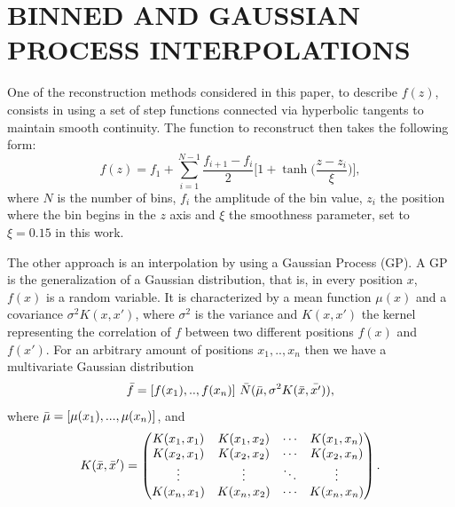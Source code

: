 \documentclass[twocolumn,a4paper,reprint,amssymb,aps,prd,groupedaddress,superscriptaddress,nofootinbib]{revtex4-2}
\begin{document}
\section{BINNED AND GAUSSIAN PROCESS INTERPOLATIONS}\label{section:bin_gp_interpolation}

One of the reconstruction methods considered in this paper, to describe $f(z)$,
consists in using a set of step functions connected via hyperbolic tangents to maintain smooth continuity. The function to reconstruct then takes the
following form:
%
\begin{equation}
    f(z)= f_1+\sum^{N-1}_{i=1}\frac{f_{i+1} - f_i}{2}\bigg[1+\tanh{\Big(\frac{z-z_i}{\xi}\Big)} \bigg],
\label{bin_equation}
\end{equation}
%
where $N$ is the number of bins, $f_i$ the amplitude of the bin value, $z_i$ the position where the bin begins in the $z$ axis and $\xi$ the smoothness parameter, set to $\xi = 0.15$ in this work.



%
The other approach is an interpolation by using a Gaussian Process (GP). A GP is the
generalization of a Gaussian distribution, that is, in every position $x$, $f(x)$ is a random variable.
It is characterized by a mean function $\mu(x)$ and a covariance $\sigma^2K(x,x')$, where $\sigma^2$ is
the variance and $K(x,x')$ the kernel representing the correlation of $f$ between two different positions
$f(x)$ and $f(x')$. For an arbitrary amount of positions $x_1,..,x_n$ then we have a multivariate Gaussian
distribution
%
\begin{equation}
    \Bar{f}=[f(x_1),..,f(x_n)]~\Bar{N}(\Bar{\mu}, \sigma^2K(\Bar{x},\Bar{x'})),
\end{equation}
%
where $\Bar{\mu}=[\mu(x_1),...,\mu(x_n)]$, and
%
\begin{equation}
K(\Bar{x},\Bar{x}') =
\begin{pmatrix}
K(x_1,x_1) & K(x_1,x_2) & \cdots & K(x_1,x_n) \\
K(x_2,x_1) & K(x_2,x_2) & \cdots & K(x_2,x_n) \\
\vdots  & \vdots  & \ddots & \vdots  \\
K(x_n,x_1) & K(x_n,x_2) & \cdots & K(x_n,x_n)
\end{pmatrix}.
\end{equation}
\end{document}
